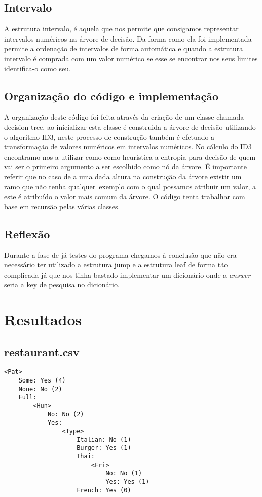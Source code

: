 \documentclass[12pt,a4paper]{article}
\begin{document}
\subsection{Intervalo}
A estrutura intervalo, é aquela que nos permite que consigamos representar intervalos numéricos na árvore de decisão. Da forma como ela foi implementada permite a ordenação de intervalos de forma automática e quando a estrutura intervalo é comprada com um valor numérico se esse se encontrar nos seus limites identifica-o como seu.

\subsection{Organização do código e implementação}
A organização deste código foi feita através da criação de um classe chamada decision tree, ao inicializar esta classe é construida a árvore de decisão utilizando o algoritmo ID3, neste processo de construção também é efetuado a transformação de valores numéricos em intervalos numéricos. No cálculo do ID3 encontramo-nos a utilizar como como heuristica a entropia para decisão de quem vai ser o primeiro argumento a ser escolhido como nó da árvore. É importante referir que no caso de a uma dada altura na construção da árvore existir um ramo que não tenha qualquer~exemplo com o qual possamos atribuir um valor, a este é atribuído o valor mais comum da árvore.
O código tenta trabalhar com base em recursão pelas várias classes.

\subsection{Reflexão}
Durante a fase de já testes do programa chegamos à conclusão que não era necessário ter utilizado a estrutura jump e a estrutura leaf de forma tão complicada já que nos tinha bastado implementar um dicionário onde a \textit{answer} seria a key de pesquisa no dicionário.

\section{Resultados}
\subsection{restaurant.csv}
\begin{lstlisting}
<Pat>
	Some: Yes (4)
	None: No (2)
	Full:
		<Hun>
			No: No (2)
			Yes:
				<Type>
					Italian: No (1)
					Burger: Yes (1)
					Thai:
						<Fri>
							No: No (1)
							Yes: Yes (1)
					French: Yes (0)
\end{lstlisting}
\end{document}
